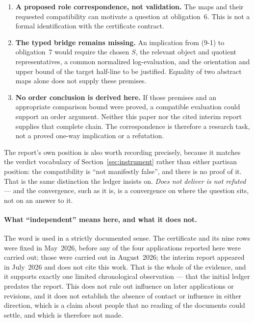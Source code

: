 \documentclass[11pt,a4paper]{article}
\theoremstyle{definition}
\begin{document}
\begin{enumerate}
\item \textbf{A proposed role correspondence, not validation.} The maps and
  their requested compatibility can motivate a question at obligation~6.
  This is not a formal identification with the certificate contract.
\item \textbf{The typed bridge remains missing.} An implication from (9-1)
  to obligation~7 would require the chosen $S$, the relevant object and
  quotient representatives, a common normalized log-evaluation, and the
  orientation and upper bound of the target half-line to be justified.
  Equality of two abstract maps alone does not supply these premises.
\item \textbf{No order conclusion is derived here.} If those premises and
  an appropriate comparison bound were proved, a compatible evaluation
  could support an order argument. Neither this paper nor the cited interim
  report supplies that complete chain. The correspondence is therefore
  a research task, not a proved one-way implication or a refutation.
\end{enumerate}

The report's own position is also worth recording precisely, because it matches
the verdict vocabulary of Section~\ref{sec:instrument} rather than either
partisan position: the compatibility is ``not manifestly false'', and there is no
proof of it. That is the same distinction the ledger insists on. \emph{Does not
deliver is not refuted} --- and the convergence, such as it is, is a convergence
on where the question sits, not on an answer to it.

\paragraph{What ``independent'' means here, and what it does not.} The word is used
in a strictly documented sense. The certificate and its nine rows were fixed in
May~2026, before any of the four applications reported here were carried out; those
were carried out in August~2026; the interim report appeared in July~2026 and does
not cite this work. That is the whole of the evidence, and it supports exactly one
limited chronological observation --- that the initial ledger predates the
report. This does not rule out influence on later applications or revisions,
and it does not establish the absence of contact or influence in either direction, which is a
claim about people that no reading of the documents could settle, and which is
therefore not made.
\end{document}
